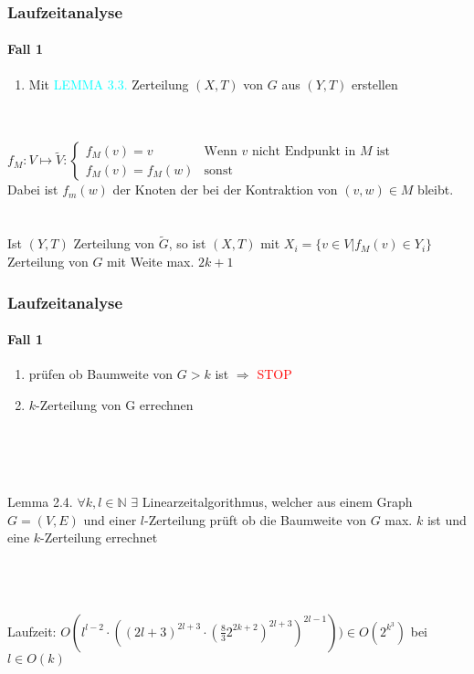 \begin{frame}
\frametitle{Laufzeitanalyse}
\framesubtitle{Fall 1}

\begin{enumerate}
	\item[4.] Mit \textcolor{cyan}{LEMMA 3.3.} Zerteilung $(X,T)$ von $G$ aus $(Y,T)$ erstellen %
\end{enumerate}
\ \\
\ \\
$
f_M: V \mapsto \widetilde{V}:
\begin{cases} %
	f_M(v) = v &\text{Wenn } v \text{ nicht Endpunkt in } M \text{ ist} \\
	f_M(v) = f_M(w) &\text{sonst}
\end{cases}$\\
Dabei ist $f_m(w)$ der Knoten der bei der Kontraktion von $(v,w) \in M$ bleibt. \\
\ \\
\ \\
Ist $(Y,T)$ Zerteilung von $\widetilde{G}$, so ist $(X,T)$ mit $X_i = \{ v \in V | f_M(v) \in Y_i \}$ Zerteilung von $G$ mit Weite max. $2k+1$
\end{frame}


\begin{frame}
\frametitle{Laufzeitanalyse}
\framesubtitle{Fall 1}

\begin{enumerate}
	\item[5.] prüfen ob Baumweite von $G > k$ ist $\Rightarrow$ \textcolor{red}{STOP}
	\item[5.1.] $k$-Zerteilung von G errechnen

\end{enumerate}
\ \\
\ \\
\ \\

\begin{KITinfoblock}{Lemma 2.4.}
$\forall k,l \in \mathbb{N}$ $\exists$ Linearzeitalgorithmus, welcher aus einem Graph $G=(V,E)$ und einer $l$-Zerteilung prüft ob die Baumweite von $G$ max. $k$ ist und eine $k$-Zerteilung errechnet
\end{KITinfoblock}

\ \\
\ \\
\ \\
Laufzeit: $O(l^{l-2} \cdot ((2l+3)^{2l+3} \cdot (\frac{8}{3} 2^{2k+2})^{2l+3})^{2l-1})) \in O(2^{k^3})$ bei $l \in O(k)$
\end{frame}